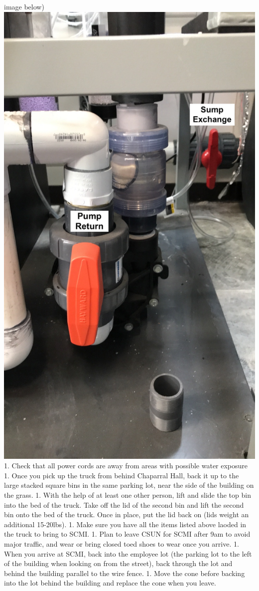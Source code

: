 \documentclass[]{book}
\begin{document}
image below) \includegraphics{images/Pump_Valve.png} 1. Check that all
power cords are away from areas with possible water exposure 1. Once you
pick up the truck from behind Chaparral Hall, back it up to the large
stacked square bins in the same parking lot, near the side of the
building on the grass. 1. With the help of at least one other person,
lift and slide the top bin into the bed of the truck. Take off the lid
of the second bin and lift the second bin onto the bed of the truck.
Once in place, put the lid back on (lids weight an additional 15-20lbs).
1. Make sure you have all the items listed above laoded in the truck to
bring to SCMI. 1. Plan to leave CSUN for SCMI after 9am to avoid major
traffic, and wear or bring closed toed shoes to wear once you arrive. 1.
When you arrive at SCMI, back into the employee lot (the parking lot to
the left of the building when looking on from the street), back through
the lot and behind the building parallel to the wire fence. 1. Move the
cone before backing into the lot behind the building and replace the
cone when you leave.
\end{document}
